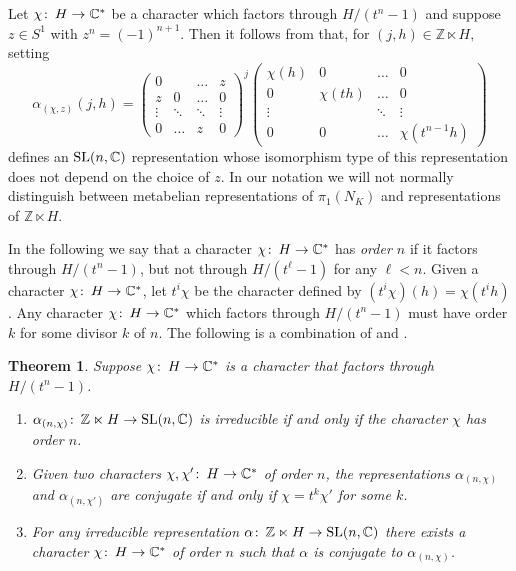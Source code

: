 \documentclass[12pt]{amsart}
\theoremstyle{plain}
\newtheorem{thm}{Theorem}
\theoremstyle{remark}
\begin{document}
Let
$\chi {\colon\thinspace} H\to {{\mathbb C}}^*$ be a character which factors through $H/(t^n-1)$ and suppose $z\in S^1$ with $z^n=(-1)^{n+1}$. Then it follows from
\cite[Section~3]{BF08} that, for $(j, h) \in {{\mathbb Z}}\ltimes H,$ setting
$$  {\alpha}_{(\chi,z)} (j,h) =
 \begin{pmatrix}
 0& &\dots &z \\
 z&0&\dots &0 \\
\vdots &\ddots &\ddots&\vdots \\
     0&\dots &z &0 \end{pmatrix}^j
     \begin{pmatrix} \chi(h) &0&\dots &0 \\
 0&\chi(th) &\dots &0 \\
\vdots &&\ddots &\vdots \\ 0&0&\dots &\chi(t^{n-1}h) \end{pmatrix}
$$
defines an  ${{\rm SL}}(n,{{\mathbb C}})$ representation whose isomorphism type of this representation does not depend on the choice of $z$.
In our notation we will not normally
distinguish between metabelian representations
of $\pi_1(N_K)$ and representations of $ {{\mathbb Z}} \ltimes H$.

In the following we say that a character $\chi {\colon\thinspace} H\to {{\mathbb C}}^*$ has \emph{order $n$} if
it factors through $H/(t^n-1)$, but not through $H/(t^\ell-1)$ for any $\ell < n$.
 Given a character  $\chi {\colon\thinspace} H\to {{\mathbb C}}^*$, let $t^i\chi$ be the character defined by $(t^i\chi)(h)=\chi(t^ih)$.
Any character $\chi {\colon\thinspace} H\to {{\mathbb C}}^*$ which factors through $H/(t^n-1)$ must have order $k$ for some
divisor $k$ of $n$.
The following is a combination of \cite[Lemma~2.2]{BF08} and  \cite[Theorem~3.3]{BF08}.

\begin{thm} \label{thm2}
Suppose  $\chi {\colon\thinspace} H  \to {{\mathbb C}}^*$ is a character that factors through $H/(t^n-1)$.
\begin{enumerate}
\item[(i)] ${\alpha}_{(n,\chi)}{\colon\thinspace} {{\mathbb Z}}\ltimes H\to {{\rm SL}}(n,{{\mathbb C}})$ is irreducible if and only if the character $\chi$ has order $n$.
\item[(ii)] Given two characters $\chi,\chi'{\colon\thinspace} H\to {{\mathbb C}}^*$ of order $n$, the representations
${\alpha}_{(n,\chi)}$ and ${\alpha}_{(n,\chi')}$ are conjugate if and only if $\chi=t^k\chi'$ for some $k$.
\item[(iii)] For any irreducible representation  ${\alpha} {\colon\thinspace}{{\mathbb Z}}\ltimes H\to {{\rm SL}}(n,{{\mathbb C}})$
 there exists a character $\chi {\colon\thinspace} H\to {{\mathbb C}}^*$ of order $n$ such that
${\alpha}$ is conjugate to ${\alpha}_{(n,\chi)}$.
\end{enumerate}
\end{thm}
\end{document}
